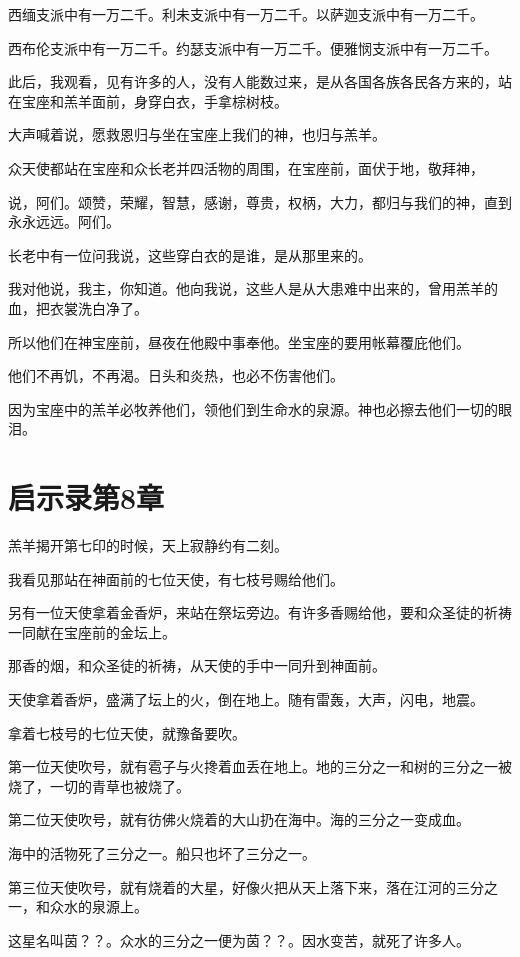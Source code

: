 \documentclass[12pt,oneside]{book}
\begin{document}
西缅支派中有一万二千。利未支派中有一万二千。以萨迦支派中有一万二千。

西布伦支派中有一万二千。约瑟支派中有一万二千。便雅悯支派中有一万二千。

此后，我观看，见有许多的人，没有人能数过来，是从各国各族各民各方来的，站在宝座和羔羊面前，身穿白衣，手拿棕树枝。

大声喊着说，愿救恩归与坐在宝座上我们的神，也归与羔羊。

众天使都站在宝座和众长老并四活物的周围，在宝座前，面伏于地，敬拜神，

说，阿们。颂赞，荣耀，智慧，感谢，尊贵，权柄，大力，都归与我们的神，直到永永远远。阿们。

长老中有一位问我说，这些穿白衣的是谁，是从那里来的。

我对他说，我主，你知道。他向我说，这些人是从大患难中出来的，曾用羔羊的血，把衣裳洗白净了。

所以他们在神宝座前，昼夜在他殿中事奉他。坐宝座的要用帐幕覆庇他们。

他们不再饥，不再渴。日头和炎热，也必不伤害他们。

因为宝座中的羔羊必牧养他们，领他们到生命水的泉源。神也必擦去他们一切的眼泪。

\chapter{启示录第8章}
羔羊揭开第七印的时候，天上寂静约有二刻。

我看见那站在神面前的七位天使，有七枝号赐给他们。

另有一位天使拿着金香炉，来站在祭坛旁边。有许多香赐给他，要和众圣徒的祈祷一同献在宝座前的金坛上。

那香的烟，和众圣徒的祈祷，从天使的手中一同升到神面前。

天使拿着香炉，盛满了坛上的火，倒在地上。随有雷轰，大声，闪电，地震。

拿着七枝号的七位天使，就豫备要吹。

第一位天使吹号，就有雹子与火搀着血丢在地上。地的三分之一和树的三分之一被烧了，一切的青草也被烧了。

第二位天使吹号，就有彷佛火烧着的大山扔在海中。海的三分之一变成血。

海中的活物死了三分之一。船只也坏了三分之一。

第三位天使吹号，就有烧着的大星，好像火把从天上落下来，落在江河的三分之一，和众水的泉源上。

这星名叫茵？？。众水的三分之一便为茵？？。因水变苦，就死了许多人。
\end{document}

